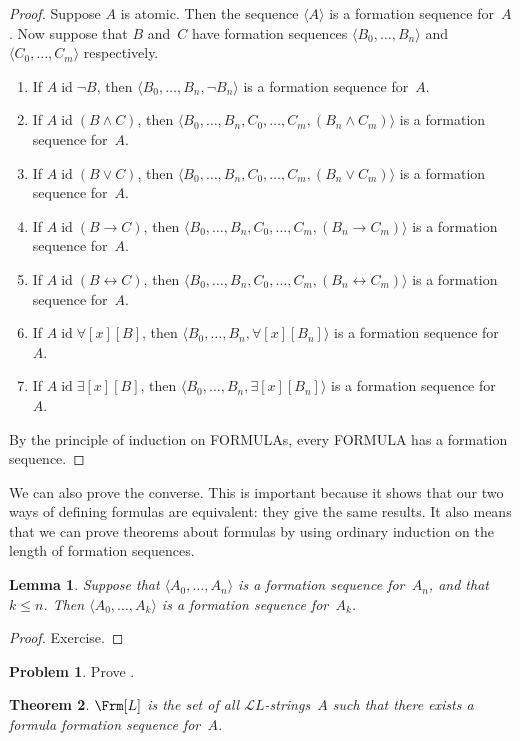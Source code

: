 \documentclass[10pt,a4paper]{article}
\makeatletter
\newcommand*{\olup}[1]{\MakeUppercase{#1}}
\theoremstyle{plain}
\newtheorem{thm}{Theorem}[section]
\newtheorem{lem}[thm]{Lemma}
\theoremstyle{definition}
\newtheorem{prob}{Problem}[section]
\theoremstyle{remark}
\newcommand*{\ollabel}[1]{\label{#1}}
\newcommand{\olref}{\@ifnextchar[{\olref@i}{\olref@final}}
\def\olref@i[#1]{\@ifnextchar[{\olref@ii}{\olref@final}}
\def\olref@ii[#1]{\@ifnextchar[{\olref@iii}{\olref@final}}
\def\olref@iii[#1]{\olref@final}
\def\olref@final#1{\ref{#1}}
\providecommand{\lif}{\mathbin{\rightarrow}}
\providecommand{\lforall}{\mathord{\forall}}
\providecommand{\lexists}{\mathord{\exists}}
\providecommand{\Lang}{\ensuremath{\mathcal{L}}}
\providecommand{\tuple}[1]{\langle #1 \rangle}
\providecommand{\tagitem}[1]{\item[#1]}
\providecommand{\liff}{\mathbin{\leftrightarrow}}
\providecommand{\ident}{\operatorname{id}}
\makeatother
\begin{document}
\begin{proof}
Suppose $A$ is atomic. Then the sequence $\tuple{A}$ is a
formation sequence for~$A$.
%
Now suppose that $B$ and~$C$ have formation sequences
$\tuple{B_0,\dotsc,B_n}$ and $\tuple{C_0,\dotsc,C_m}$
respectively.
%
\begin{enumerate}
  \tagitem{prvNot}{If $A \ident \lnot B$,
      then $\tuple{B_0,\dotsc,B_n,\lnot B_n}$
      is a formation sequence for~$A$.}{}
  \tagitem{prvAnd}{If $A \ident (B \land C)$,
      then $\tuple{B_0,\dotsc,B_n,C_0,\dotsc,C_m,(B_n \land C_m)}$
      is a formation sequence for~$A$.}{}
  \tagitem{prvOr}{If $A \ident (B \lor C)$,
      then $\tuple{B_0,\dotsc,B_n,C_0,\dotsc,C_m,(B_n \lor C_m)}$
      is a formation sequence for~$A$.}{}
  \tagitem{prvIf}{If $A \ident (B \lif C)$,
      then $\tuple{B_0,\dotsc,B_n,C_0,\dotsc,C_m,(B_n \lif C_m)}$
      is a formation sequence for~$A$.}{}
  \tagitem{prvIff}{If $A \ident (B \liff C)$,
      then $\tuple{B_0,\dotsc,B_n,C_0,\dotsc,C_m,(B_n \liff C_m)}$
      is a formation sequence for~$A$.}{}
  \tagitem{prvAll}{If $A \ident \lforall[x][B]$,
      then $\tuple{B_0,\dotsc,B_n,\lforall[x][B_n]}$
      is a formation sequence for~$A$.}{}
  \tagitem{prvEx}{If $A \ident \lexists[x][B]$,
      then $\tuple{B_0,\dotsc,B_n,\lexists[x][B_n]}$
      is a formation sequence for~$A$.}{}
\end{enumerate}
By the principle of induction on \olup{formula}s,
every \olup{formula} has a formation sequence.
\end{proof}

We can also prove the converse. This is important because it shows
that our two ways of defining formulas are equivalent: they give
the same results. It also means that we can prove theorems about
formulas by using ordinary induction on the length of formation
sequences.

\begin{lem}
\ollabel{lem:fseq-init}
Suppose that $\tuple{A_0,\dotsc,A_n}$ is a formation sequence
for~$A_n$, and that $k \leq n$. Then $\tuple{A_0,\dotsc,A_k}$
is a formation sequence for~$A_k$.
\end{lem}

\begin{proof}
Exercise.
\end{proof}

\begin{prob}
Prove \olref[fol][syn][fseq]{lem:fseq-init}.
\end{prob}

\begin{thm}
\ollabel{thm:fseq-frm-equiv}
$\Frm[L]$ is the set of all $\Lang L$-strings~$A$ such that
there exists a formula formation sequence for~$A$.
\end{thm}
\end{document}
